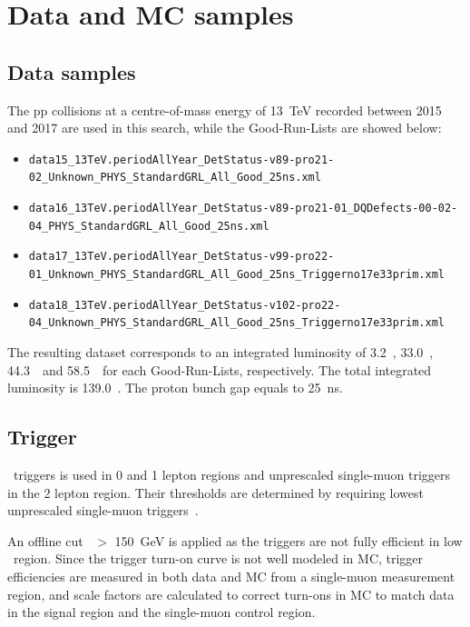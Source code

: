 \chapter{Data and MC samples}
\label{ch:ana-intro}

\section{Data samples}
The pp collisions at a centre-of-mass
energy of 13~TeV recorded between 2015 and 2017 are used in this search, while the Good-Run-Lists are showed below:
\begin{itemize}
        \scriptsize
\item \texttt{data15\_13TeV.periodAllYear\_DetStatus-v89-pro21-02\_Unknown\_PHYS\_StandardGRL\_All\_Good\_25ns.xml}
\item \texttt{data16\_13TeV.periodAllYear\_DetStatus-v89-pro21-01\_DQDefects-00-02-04\_PHYS\_StandardGRL\_All\_Good\_25ns.xml}
\item \texttt{data17\_13TeV.periodAllYear\_DetStatus-v99-pro22-01\_Unknown\_PHYS\_StandardGRL\_All\_Good\_25ns\_Triggerno17e33prim.xml}
\item \texttt{data18\_13TeV.periodAllYear\_DetStatus-v102-pro22-04\_Unknown\_PHYS\_StandardGRL\_All\_Good\_25ns\_Triggerno17e33prim.xml}
\end{itemize}
The resulting dataset corresponds to an integrated luminosity of 3.2~\ifb, 33.0~\ifb, 44.3~\ifb\ and 58.5~\ifb\ for each Good-Run-Lists, respectively. The total integrated luminosity is 139.0~\ifb. The proton bunch gap equals to 25~ns.


\section{Trigger}
\label{sec:trigger}

\par \MET~triggers is used in 0 and 1 lepton regions and unprescaled single-muon triggers in the 2 lepton region. 
Their thresholds are determined by requiring lowest unprescaled single-muon triggers~\cite{lowest_unprescaled_triggers}. 

\par An offline cut \MET~$>$ 150~GeV is applied as the triggers are not fully efficient in low \MET~region. Since the trigger turn-on curve is not well modeled in MC,
 trigger efficiencies are measured in both data and MC from a single-muon measurement region, and scale factors are calculated to correct
turn-ons in MC to match data in the signal region and the single-muon control region.

